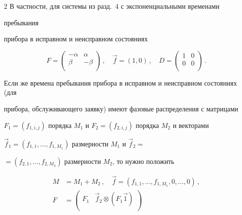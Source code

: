 \begin{multicols}{2}
В частности, для системы из разд.~4 с экспоненциальными временами


пребывания


прибора в исправном и неисправном состояниях





\noindent


$$


F =


\begin{pmatrix}


-\alpha   &   \alpha \\


\beta     &   -\beta \\


\end{pmatrix}\,,\quad


\vec f = (1,0)\,,\quad D =


\begin{pmatrix}


1   &   0 \\


0   &   0 \\


\end{pmatrix}\,.


$$





Если же времена пребывания прибора в исправном и неисправном состояниях (для 


прибора, обслуживающего заявку) имеют фазовые распределения с матрицами 


$F_1=(f_{1,i,j})$ порядка $M_1$ и $F_2=(f_{2,i,j})$ порядка $M_2$ и векторами 


$\vec f_1=(f_{1,1},\ldots,f_{1,M_1})$ размерности $M_1$ и $\vec f_2=$ 


$=(f_{2,1},\ldots,f_{2,M_2})$ размерности $M_2$, то нужно положить


\begin{align*} %


M &=M_1+M_2\,,\quad


\vec f = (f_{1,1},\ldots,f_{1,M_1},0,\ldots, 0)\,,\\


F &=


\begin{pmatrix}


F_1                             &   \vec f_2 \otimes (F_1 \vec1)     \\



\end{pmatrix}
\end{align*}
\end{multicols}
